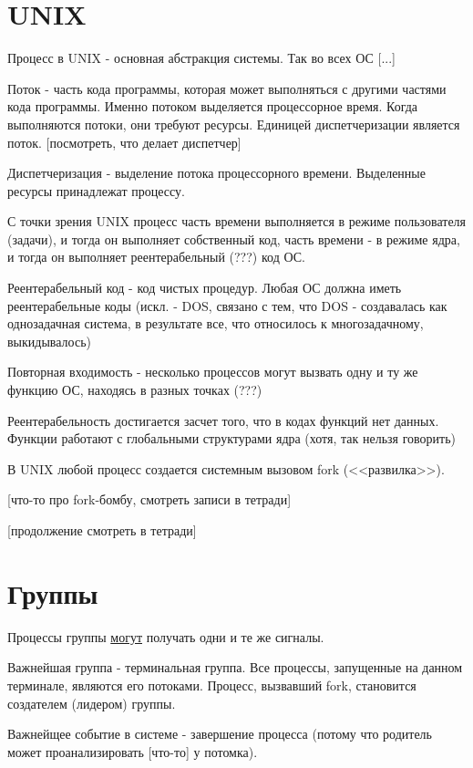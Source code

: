 \documentclass[14pt, a4paper]{article}
\begin{document}
	\section{UNIX}
	
	Процесс в UNIX - основная абстракция системы.
	Так во всех ОС [...]
	
	Поток - часть кода программы, которая может выполняться с другими частями кода программы. Именно потоком выделяется процессорное время.
	Когда выполняются потоки, они требуют ресурсы. Единицей диспетчеризации является поток. [посмотреть, что делает диспетчер]
	
	Диспетчеризация - выделение потока процессорного времени. Выделенные ресурсы принадлежат процессу.
	
	С точки зрения UNIX процесс часть времени выполняется в режиме пользователя (задачи), и тогда он выполняет собственный код, часть времени -
	в режиме ядра, и тогда он выполняет реентерабельный (???) код ОС.
	
	Реентерабельный код - код чистых процедур. Любая ОС должна иметь реентерабельные коды (искл. - DOS, связано с тем, что DOS - создавалась как однозадачная система, в результате все, что относилось к многозадачному, выкидывалось)
	
	Повторная входимость - несколько процессов могут вызвать одну и ту же функцию ОС, находясь в разных точках (???)
	
	Реентерабельность достигается засчет того, что в кодах функций нет данных. Функции работают с глобальными структурами ядра (хотя, так нельзя говорить)
	
	В UNIX любой процесс создается системным вызовом fork (<<развилка>>).
	
	[что-то про fork-бомбу, смотреть записи в тетради]
	
	[продолжение смотреть в тетради]
	
	\section{Группы}
	
	Процессы группы \underline{могут} получать одни и те же сигналы.
	
	Важнейшая группа - терминальная группа. Все процессы, запущенные на данном терминале, являются его потоками.
	Процесс, вызвавший fork, становится создателем (лидером) группы.
	
	Важнейщее событие в системе - завершение процесса (потому что родитель может проанализировать [что-то] у потомка).
	
\end{document}
